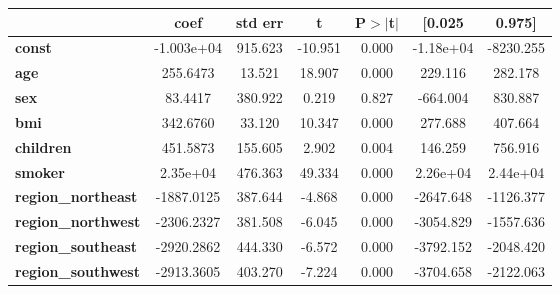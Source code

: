 \begin{center}
\begin{tabular}{lcccccc}
\toprule
                           & \textbf{coef} & \textbf{std err} & \textbf{t} & \textbf{P$> |$t$|$} & \textbf{[0.025} & \textbf{0.975]}  \\
\midrule
\textbf{const}             &   -1.003e+04  &      915.623     &   -10.951  &         0.000        &    -1.18e+04    &    -8230.255     \\
\textbf{age}               &     255.6473  &       13.521     &    18.907  &         0.000        &      229.116    &      282.178     \\
\textbf{sex}               &      83.4417  &      380.922     &     0.219  &         0.827        &     -664.004    &      830.887     \\
\textbf{bmi}               &     342.6760  &       33.120     &    10.347  &         0.000        &      277.688    &      407.664     \\
\textbf{children}          &     451.5873  &      155.605     &     2.902  &         0.004        &      146.259    &      756.916     \\
\textbf{smoker}            &     2.35e+04  &      476.363     &    49.334  &         0.000        &     2.26e+04    &     2.44e+04     \\
\textbf{region\_northeast} &   -1887.0125  &      387.644     &    -4.868  &         0.000        &    -2647.648    &    -1126.377     \\
\textbf{region\_northwest} &   -2306.2327  &      381.508     &    -6.045  &         0.000        &    -3054.829    &    -1557.636     \\
\textbf{region\_southeast} &   -2920.2862  &      444.330     &    -6.572  &         0.000        &    -3792.152    &    -2048.420     \\
\textbf{region\_southwest} &   -2913.3605  &      403.270     &    -7.224  &         0.000        &    -3704.658    &    -2122.063     \\
\bottomrule
\end{tabular}
\end{center}